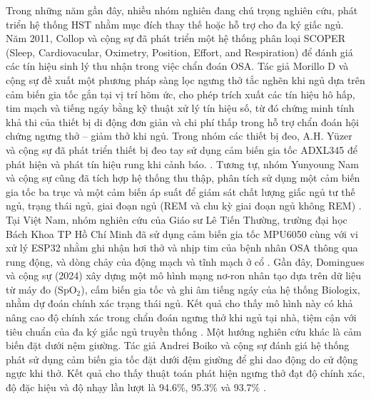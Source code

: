 Trong những năm gần đây, nhiều nhóm nghiên đang chú trọng nghiên cứu, phát triển hệ thống HST nhằm mục đích thay thế hoặc hỗ trợ cho đa ký giấc ngủ. Năm 2011, Collop và cộng sự đã phát triển một hệ thống phân loại SCOPER (Sleep, Cardiovacular, Oximetry, Position, Effort, and Respiration) để đánh giá các tín hiệu sinh lý thu nhận trong việc chẩn đoán OSA\cite{hst_6p_paper}. Tác giả Morillo D và cộng sự đề xuất một phương pháp sàng lọc ngưng thở tắc nghẽn khi ngủ dựa trên cảm biến gia tốc gắn tại vị trí hõm ức, cho phép trích xuất các tín hiệu hô hấp, tim mạch và tiếng ngáy bằng kỹ thuật xử lý tín hiệu số, từ đó chứng minh tính khả thi của thiết bị di động đơn giản và chi phí thấp trong hỗ trợ chẩn đoán hội chứng ngưng thở – giảm thở khi ngủ\cite{morillo2010accelerometer}. Trong nhóm các thiết bị đeo, A.H. Yüzer và cộng sự đã phát triển thiết bị đeo tay sử dụng cảm biến gia tốc ADXL345 để phát hiện và phát tín hiệu rung khi cảnh báo. \cite{hst_wear_paper}. Tương tự, nhóm Yunyoung Nam và cộng sự cũng đã tích hợp hệ thống thu thập, phân tích sử dụng một cảm biến gia tốc ba trục và một cảm biến áp suất để giám sát chất lượng giấc ngủ tư thế ngủ, trạng thái ngủ, giai đoạn ngủ (REM và chu kỳ giai đoạn ngủ không REM) \cite{hst_pressure_paper}. Tại Việt Nam, nhóm nghiên cứu của  Giáo sư Lê Tiến Thường, trường đại học Bách Khoa TP Hồ Chí Minh đã sử dụng cảm biến gia tốc MPU6050 cùng với vi xử lý ESP32 nhằm ghi nhận hơi thở và nhịp tim của bệnh nhân OSA thông qua rung động, và dòng chảy của động mạch và tĩnh mạch ở cổ \cite{thuong_wear_paper}. Gần đây, Domingues và cộng sự (2024) xây dựng một mô hình mạng nơ-ron nhân tạo dựa trên dữ liệu từ máy đo (SpO$_2$), cấm biến gia tốc và ghi âm tiếng ngáy của hệ thống Biologix, nhằm dự đoán chính xác trạng thái ngủ. Kết quả cho thấy mô hình này có khả nâng cao độ chính xác trong chẩn đoán ngưng thở khi ngủ tại nhà, tiệm cận với tiêu chuẩn của đa ký giấc ngủ truyền thống \cite{domingues2024sleep}. Một hướng nghiên cứu khác là cảm biến đặt dưới nệm giường. Tác giả Andrei Boiko và cộng sự đánh giá hệ thống phát sử dụng cảm biến gia tốc đặt dưới đệm giường để ghi dao động do cử động ngực khi thở. Kết quả cho thấy thuật toán phát hiện ngưng thở đạt độ chính xác, độ đặc hiệu và độ nhạy lần lượt là 94.6\%, 95.3\% và 93.7\% \cite{Boiko2023}. 

